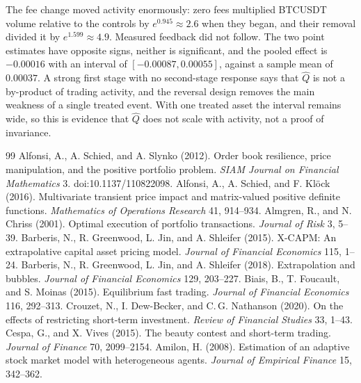 \documentclass[12pt]{article}
\theoremstyle{definition}
\theoremstyle{remark}
\begin{document}
The fee change moved activity enormously: zero fees multiplied BTCUSDT volume relative to the controls by $e^{0.945}\approx2.6$ when they began, and their removal divided it by $e^{1.599}\approx4.9$. Measured feedback did not follow. The two point estimates have opposite signs, neither is significant, and the pooled effect is $-0.00016$ with an interval of $[-0.00087,0.00055]$, against a sample mean of $0.00037$. A strong first stage with no second-stage response says that $\hat Q$ is not a by-product of trading activity, and the reversal design removes the main weakness of a single treated event. With one treated asset the interval remains wide, so this is evidence that $\hat Q$ does not scale with activity, not a proof of invariance.


\begin{thebibliography}{99}\setlength{\itemsep}{2pt}\small
{} Alfonsi, A., A. Schied, and A. Slynko (2012). Order book resilience, price manipulation, and the positive portfolio problem. \emph{SIAM Journal on Financial Mathematics} 3. doi:10.1137/110822098.
 Alfonsi, A., A. Schied, and F. Kl\"ock (2016). Multivariate transient price impact and matrix-valued positive definite functions. \emph{Mathematics of Operations Research} 41, 914--934.
 Almgren, R., and N. Chriss (2001). Optimal execution of portfolio transactions. \emph{Journal of Risk} 3, 5--39.
 Barberis, N., R. Greenwood, L. Jin, and A. Shleifer (2015). X-CAPM: An extrapolative capital asset pricing model. \emph{Journal of Financial Economics} 115, 1--24.
 Barberis, N., R. Greenwood, L. Jin, and A. Shleifer (2018). Extrapolation and bubbles. \emph{Journal of Financial Economics} 129, 203--227.
 Biais, B., T. Foucault, and S. Moinas (2015). Equilibrium fast trading. \emph{Journal of Financial Economics} 116, 292--313.
 Crouzet, N., I. Dew-Becker, and C.\,G. Nathanson (2020). On the effects of restricting short-term investment. \emph{Review of Financial Studies} 33, 1--43.
 Cespa, G., and X. Vives (2015). The beauty contest and short-term trading. \emph{Journal of Finance} 70, 2099--2154.
 Amilon, H. (2008). Estimation of an adaptive stock market model with heterogeneous agents. \emph{Journal of Empirical Finance} 15, 342--362.

\end{thebibliography}
\end{document}
